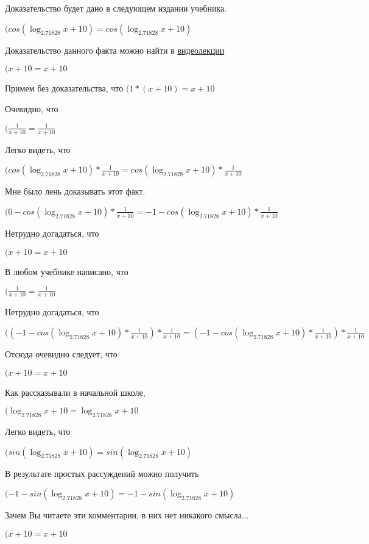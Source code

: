 \documentclass[12pt,a4paper,fleqn]{article}
\theoremstyle{definition}
\begin{document}
Доказательство будет дано в следующем издании учебника.

$(cos(\log_{ 2.71828 }{ x  +  10 }) = cos(\log_{ 2.71828 }{ x  +  10 })$

Доказательство данного факта можно найти в \href{https://www.youtube.com/watch?v=dQw4w9WgXcQ}{видеолекции}

$( x  +  10  =  x  +  10 $

Примем без доказательства, что
$( 1  * ( x  +  10 ) =  x  +  10 $

Очевидно, что

$(\frac{ 1 }{ x  +  10 }
 = \frac{ 1 }{ x  +  10 }
$

Легко видеть, что

$(cos(\log_{ 2.71828 }{ x  +  10 }) * \frac{ 1 }{ x  +  10 }
 = cos(\log_{ 2.71828 }{ x  +  10 }) * \frac{ 1 }{ x  +  10 }
$

Мне было лень доказывать этот факт.

$( 0  - cos(\log_{ 2.71828 }{ x  +  10 }) * \frac{ 1 }{ x  +  10 }
 =  -1  - cos(\log_{ 2.71828 }{ x  +  10 }) * \frac{ 1 }{ x  +  10 }
$

Нетрудно догадаться, что

$( x  +  10  =  x  +  10 $

В любом учебнике написано, что

$(\frac{ 1 }{ x  +  10 }
 = \frac{ 1 }{ x  +  10 }
$

Нетрудно догадаться, что

$(( -1  - cos(\log_{ 2.71828 }{ x  +  10 }) * \frac{ 1 }{ x  +  10 }
) * \frac{ 1 }{ x  +  10 }
 = ( -1  - cos(\log_{ 2.71828 }{ x  +  10 }) * \frac{ 1 }{ x  +  10 }
) * \frac{ 1 }{ x  +  10 }
$

Отсюда очевидно следует, что

$( x  +  10  =  x  +  10 $

Как рассказывали в начальной школе,

$(\log_{ 2.71828 }{ x  +  10 } = \log_{ 2.71828 }{ x  +  10 }$

Легко видеть, что

$(sin(\log_{ 2.71828 }{ x  +  10 }) = sin(\log_{ 2.71828 }{ x  +  10 })$

В результате простых рассуждений можно получить

$( -1  - sin(\log_{ 2.71828 }{ x  +  10 }) =  -1  - sin(\log_{ 2.71828 }{ x  +  10 })$

Зачем Вы читаете эти комментарии, в них нет никакого смысла...

$( x  +  10  =  x  +  10 $
\end{document}
